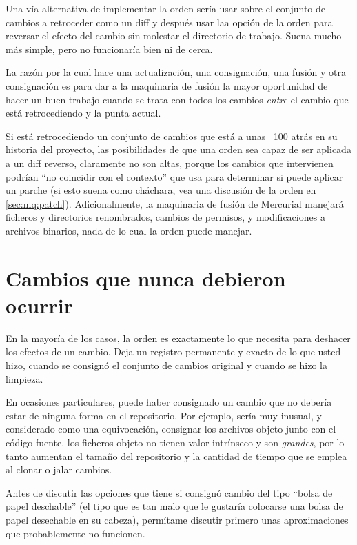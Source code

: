 Una vía alternativa de implementar la orden  sería usar
 sobre el conjunto de cambios a retroceder como un diff
y después usar laa opción  de la orden
 para reversar el efecto del cambio sin molestar el
directorio de trabajo.  Suena mucho más simple, pero no funcionaría
bien ni de cerca.

La razón por la cual  hace una actualización, una
consignación, una fusión y otra consignación es para dar a la
maquinaria de fusión la mayor oportunidad de hacer un buen trabajo
cuando se trata con todos los cambios \emph{entre} el cambio que está
retrocediendo y la punta actual.

Si está retrocediendo un conjunto de cambios que está a unas ~100
atrás en su historia del proyecto, las posibilidades de que una orden
 sea capaz de ser aplicada a un diff reverso,
claramente no son altas, porque los cambios que intervienen podrían
``no coincidir con el contexto'' que  usa  para
determinar si puede aplicar un parche (si esto suena como cháchara,
vea una discusión de la orden  en \ref{sec:mq:patch}).
Adicionalmente, la maquinaria de fusión de Mercurial manejará ficheros
y directorios renombrados, cambios de permisos, y modificaciones a
archivos binarios, nada de lo cual la orden  puede manejar.

\section{Cambios que nunca debieron ocurrir}
\label{sec:undo:aaaiiieee}

En la mayoría de los casos, la orden  es exactamente lo
que necesita para deshacer los efectos de un cambio.  Deja un registro
permanente y exacto de lo que usted hizo, cuando se consignó el
conjunto de cambios original y cuando se hizo la limpieza.

En ocasiones particulares, puede haber consignado un cambio que no
debería estar de ninguna forma en el repositorio.  Por ejemplo, sería
muy inusual, y considerado como una equivocación, consignar los
archivos objeto junto con el código fuente. los ficheros objeto no
tienen valor intrínseco y son \emph{grandes}, por lo tanto aumentan el
tamaño del repositorio y la cantidad de tiempo que se emplea al clonar
o jalar cambios.

Antes de discutir las opciones que tiene si consignó cambio del tipo 
``bolsa de papel deschable'' (el tipo que es tan malo que le gustaría
colocarse una bolsa de papel desechable en su cabeza), permítame
discutir primero unas aproximaciones que probablemente no funcionen.


